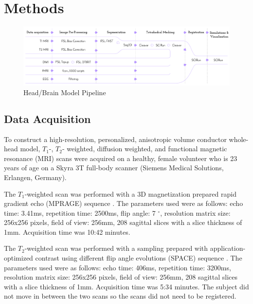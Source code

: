 
\section{Methods}
\label{sec:Methods}

\begin{figure}[H]
    \centering
    \includegraphics[width=\textwidth]{Figures/pipeline}
    \caption{Head/Brain Model Pipeline}
    \label{fig:pipeline}
\end{figure}

\subsection{Data Acquisition}
\label{sec:Data}


To construct a high-resolution, personalized, anisotropic volume conductor whole-head model, $T_1$-, $T_2$- weighted, diffusion weighted, and functional magnetic resonance (MRI) scans were acquired on a healthy, female volunteer who is 23 years of age on a Skyra 3T full-body scanner (Siemens Medical Solutions, Erlangen, Germany). 

The $T_1$-weighted scan was performed with a 3D magnetization prepared rapid gradient echo (MPRAGE) sequence \cite{ref:mprage}. The parameters used were as follows: echo time: 3.41ms, repetition time: 2500ms, flip angle: 7 $^{\circ}$, resolution matrix size: 256x256 pixels, field of view: 256mm, 208 sagittal slices with a slice thickness of 1mm. Acquisition time was 10:42 minutes. 

The $T_2$-weighted scan was performed with a sampling prepared with application-optimized contrast using different flip angle evolutions (SPACE) sequence \cite{ref:space}. The parameters used were as follows: echo time: 406ms, repetition time: 3200ms, resolution matrix size: 256x256 pixels, field of view: 256mm, 208 sagittal slices with a slice thickness of 1mm. Acquisition time was 5:34 minutes. The subject did not move in between the two scans so the scans did not need to be registered. 

